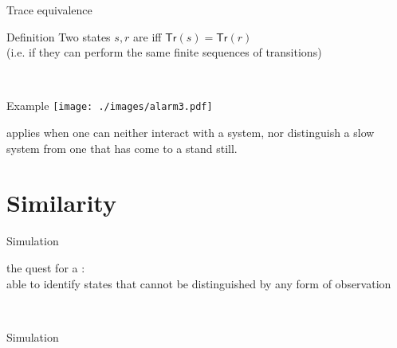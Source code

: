 \documentclass{beamer}
\def\Tr#1{\mathsf{Tr}(#1)}
\begin{document}
\begin{slide}{Trace  equivalence}
\small

\begin{block}{Definition}
Two states $s, r$ are  iff  $ \Tr{s} =  \Tr{r}$\\
(i.e. if they can perform the same finite sequences of transitions)
\end{block}
~\\

\begin{block}{Example}
  \centering
  \texttt{[image: ./images/alarm3.pdf]}
\end{block}


 applies  when one can neither interact with a system, nor distinguish a slow system from one that has come to a stand still.
\end{slide}



\section{Similarity}

\begin{slide}{Simulation}
\begin{flushright}
the quest for a :\\
able to identify states that cannot be distinguished by any  form of  observation
\end{flushright}
~\\

\small
\begin{block}{Simulation}
\end{block}
\end{slide}
\end{document}
